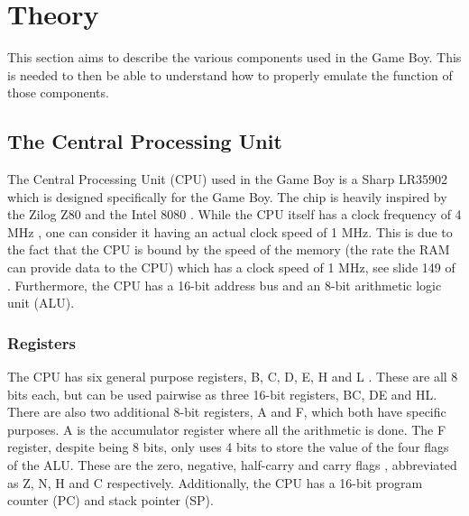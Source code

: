 \chapter{Theory}
\label{chap:Theory}

This section aims to describe the various components used in the Game Boy. This is needed to then be able to understand how to properly emulate the function of those components.

\section{The Central Processing Unit}
The Central Processing Unit (CPU) used in the Game Boy is a Sharp LR35902 \cite{pandoscspecifications} \cite{gameboyhistory} which is designed specifically for the Game Boy. The chip is heavily inspired by the Zilog Z80 \cite{Z80} and the Intel 8080 \cite{Intel8080}. While the CPU itself has a clock frequency of 4 MHz \cite{pandoscspecifications}, one can consider it having an actual clock speed of 1 MHz. 
This is due to the fact that the CPU is bound by the speed of the memory \cite{GBTClockSpeed} (the rate the RAM can provide data to the CPU) which has a clock speed of 1 MHz, see slide 149 of  \cite{ultimateGBtalkSlides}. 
Furthermore, the CPU has a 16-bit address bus \cite{pandocsmemorymap} and an 8-bit arithmetic logic unit (ALU).
\subsection{Registers}
The CPU has six general purpose registers, B, C, D, E, H and L \cite{pandocsregistersandflags}. These are all 8 bits each, but can be used pairwise as three 16-bit registers, BC, DE and HL. There are also two additional 8-bit registers, A and F, which both have specific purposes. A is the accumulator register where all the arithmetic is done. The F register, despite being 8 bits, only uses 4 bits to store the value of the four flags of the ALU. These are the zero, negative, half-carry and carry flags \cite{pandocsregistersandflags}, abbreviated as Z, N, H and C respectively. Additionally, the CPU has a 16-bit program counter (PC) and stack pointer (SP).

